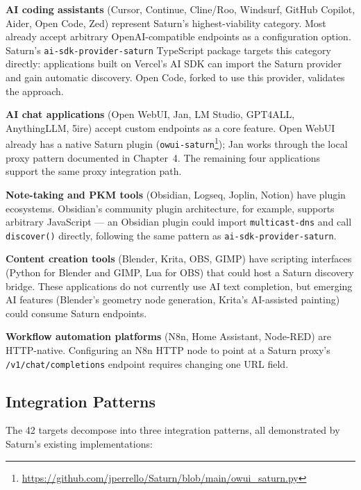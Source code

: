 \textbf{AI coding assistants} (Cursor, Continue, Cline/Roo, Windsurf, GitHub Copilot, Aider, Open Code, Zed) represent Saturn's highest-viability category. Most already accept arbitrary OpenAI-compatible endpoints as a configuration option. Saturn's \texttt{ai-sdk-provider-saturn} TypeScript package targets this category directly: applications built on Vercel's AI SDK can import the Saturn provider and gain automatic discovery. Open Code, forked to use this provider, validates the approach.

\textbf{AI chat applications} (Open WebUI, Jan, LM Studio, GPT4ALL, AnythingLLM, 5ire) accept custom endpoints as a core feature. Open WebUI already has a native Saturn plugin (\texttt{owui-saturn}\footnote{\url{https://github.com/jperrello/Saturn/blob/main/owui_saturn.py}}); Jan works through the local proxy pattern documented in Chapter~4. The remaining four applications support the same proxy integration path.

\textbf{Note-taking and PKM tools} (Obsidian, Logseq, Joplin, Notion) have plugin ecosystems. Obsidian's community plugin architecture, for example, supports arbitrary JavaScript --- an Obsidian plugin could import \texttt{multicast-dns} and call \texttt{discover()} directly, following the same pattern as \texttt{ai-sdk-provider-saturn}.

\textbf{Content creation tools} (Blender, Krita, OBS, GIMP) have scripting interfaces (Python for Blender and GIMP, Lua for OBS) that could host a Saturn discovery bridge. These applications do not currently use AI text completion, but emerging AI features (Blender's geometry node generation, Krita's AI-assisted painting) could consume Saturn endpoints.

\textbf{Workflow automation platforms} (N8n, Home Assistant, Node-RED) are HTTP-native. Configuring an N8n HTTP node to point at a Saturn proxy's \texttt{/v1/chat/completions} endpoint requires changing one URL field.

\subsection{Integration Patterns}

The 42 targets decompose into three integration patterns, all demonstrated by Saturn's existing implementations:

